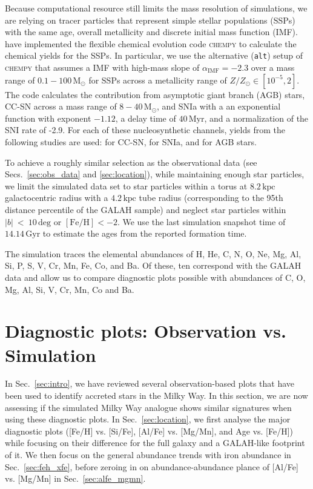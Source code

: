 \documentclass[fleqn,usenatbib]{mnras}
\begin{document}
Because computational resource still limits the mass resolution of simulations, we are relying on tracer particles that represent simple stellar populations (SSPs) with the same age, overall metallicity and discrete initial mass function (IMF). \citet{Buck2021} have implemented the flexible chemical evolution code \textsc{chempy} \citep{Rybizki2017} to calculate the chemical yields for the SSPs. In particular, we use the alternative (\texttt{alt}) setup of \textsc{chempy} that assumes a \citet{Chabrier2003} IMF with high-mass slope of $\alpha_\text{IMF} = -2.3$ over a mass range of $0.1-100\,\mathrm{M_\odot}$ for SSPs across a metallicity range of $Z/Z_\odot \in [10^{-5},2]$. The code calculates the contribution from asymptotic giant branch (AGB) stars, CC-SN across a mass range of $8-40\,\mathrm{M_\odot}$, and SNIa with a an exponential function with exponent $-1.12$, a delay time of $40\,\mathrm{Myr}$, and a normalization of the SNI rate of -2.9. For each of these nucleosynthetic channels, yields from the following studies are used: \citet{Limongi2018} for CC-SN, \citet{Seitenzahl2013} for SNIa, and \citet{Karakas2016} for AGB stars.

To achieve a roughly similar selection as the observational data (see Secs.~\ref{sec:obs_data} and \ref{sec:location}), while maintaining enough star particles, we limit the simulated data set to star particles within a torus at $8.2\,\mathrm{kpc}$ galactocentric radius with a $4.2\,\mathrm{kpc}$ tube radius (corresponding to the 95th distance percentile of the GALAH sample) and neglect star particles within $\vert b \vert~<~10\,\mathrm{deg}$ or $\mathrm{[Fe/H]} < -2$. We 
use the last simulation snapshot time of $14.14\,\mathrm{Gyr}$ to estimate the ages from the reported formation time.

The simulation traces the elemental abundances of H, He, C, N, O, Ne, Mg, Al, Si, P, S, V, Cr, Mn, Fe, Co, and Ba. Of these, ten correspond with the GALAH data and allow us to compare diagnostic plots possible with abundances of C, O, Mg, Al, Si, V, Cr, Mn, Co and Ba.


\section{Diagnostic plots: Observation vs. Simulation}
\label{sec:comparison}

In Sec.~\ref{sec:intro}, we have reviewed several observation-based plots that have been used to identify accreted stars in the Milky Way. In this section, we are now assessing if the simulated Milky Way analogue shows similar signatures when using these diagnostic plots. In Sec.~\ref{sec:location}, we first analyse the major diagnostic plots ([Fe/H] vs. [Si/Fe], [Al/Fe] vs. [Mg/Mn], and Age vs. [Fe/H]) while focusing on their difference for the full galaxy and a GALAH-like footprint of it. We then focus on the general abundance trends with iron abundance in Sec.~\ref{sec:feh_xfe}, before zeroing in on abundance-abundance plance of [Al/Fe] vs. [Mg/Mn] in Sec.~\ref{sec:alfe_mgmn}.
\end{document}
